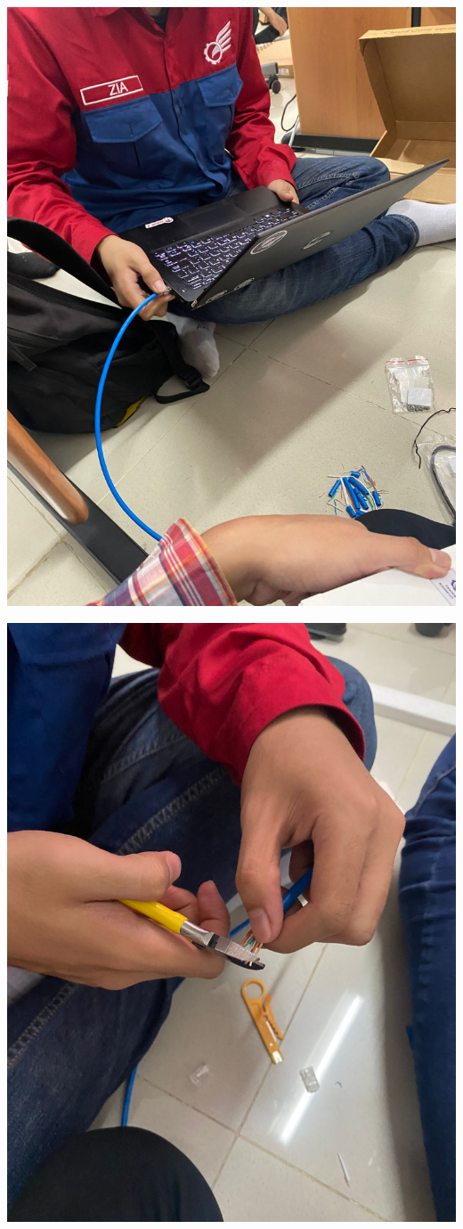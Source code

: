     \begin{center}
        \includegraphics[scale=0.1]{P1/img/1-7.jpg}
    \end{center}
    \begin{center}
        \includegraphics[scale=0.1]{P1/img/1-5.jpg}
    \end{center}